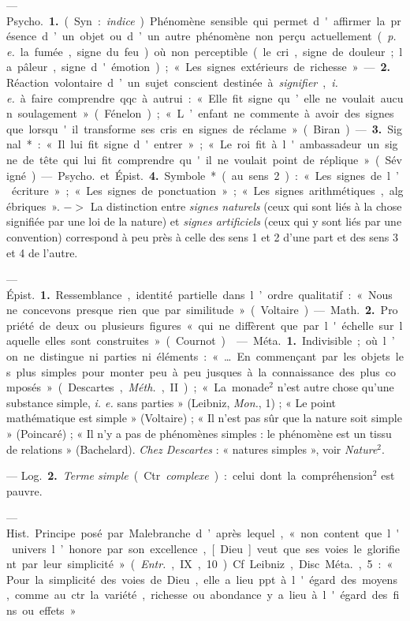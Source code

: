\begin{itemize}[leftmargin=1cm, label=, itemsep=1pt]
 — \si{Psycho.} {\bf 1.} (Syn. : {\it indice}). Phénomène sensible
qui permet d'affirmer la présence d’un objet ou d’un autre phénomène non
perçu actuellement ({\it p. e.} la fumée, signe du feu) où non perceptible
(le cri, signe de douleur ; la pâleur, signe d'émotion) ; « Les signes
extérieurs de richesse ». — {\bf 2.} Réaction volontaire d’un sujet conscient
destinée à {\it signifier}, {\it i. e.} à faire comprendre qqc. à autrui : «
Elle fit signe qu’elle ne voulait aucun soulagement » (Fénelon) ; « L’enfant
ne commente à avoir des signes que lorsqu'il transforme ses cris en signes de
réclame » (Biran). — {\bf 3.} Signal* : « Il lui fit signe d'entrer » ; « Le
roi fit à l'ambassadeur un signe de tête qui lui fit comprendre qu'il ne
voulait point de réplique » (Sévigné). — \si{Psycho.} et \si{Épist.} {\bf 4.}
Symbole* (au sens 2) : « Les signes de l’écriture »; « Les signes de
ponctuation »; « Les signes arithmétiques, algébriques ». $->$ La distinction
entre {\it signes naturels} (ceux qui sont liés à la chose signifiée par une
loi de la nature) et {\it signes artificiels} (ceux qui y sont liés par une
convention) correspond à peu près à celle des sens 1 et 2 d’une part et des
sens 3 et 4 de l'autre.

 — \si{Épist.} {\bf 1.} Ressemblance, identité partielle dans
l’ordre qualitatif : « Nous ne concevons presque rien que par
similitude » (Voltaire). — \si{Math.} {\bf 2.} Propriété de deux ou plusieurs
figures « qui ne diffèrent
que par l'échelle sur laquelle elles sont construites » (Cournot).

 — \si{Méta.} {\bf 1.} Indivisible ; où l’on ne distingue ni
parties ni éléments : « … En commençant par les objets les plus simples...
pour monter peu à peu jusques à la connaissance des plus
composés » (Descartes, {\it Méth.}, II) ; « La monade$^2$ n’est autre chose
qu’une substance simple, {\it i. e.} sans parties » (Leibniz, {\it Mon.},
1) ; « Le point mathématique est simple » (Voltaire) ; « Il n’est pas sûr que
la nature soit simple » (Poincaré) ; « Il n'y a pas de phénomènes simples :
le phénomène est un tissu de relations » (Bachelard). {\it Chez Descartes} :
« natures simples », voir {\it Nature}$^2$.

— \si{Log.} {\bf 2.} {\it Terme simple} (Ctr.
{\it complexe}) : celui dont la compréhension$^2$ est pauvre.

 — \si{Hist.} Principe posé par Malebranche d’après
lequel, « non content que l'univers l’honore par son excellence, [Dieu] veut
que ses voies le glorifient par leur simplicité » ({\it Entr.}, IX, 10). Cf.
Leibniz, Disc. \si{Méta.}, 5 : « Pour la simplicité des voies de Dieu, elle a
lieu ppt. à l'égard des moyens, comme au ctr. la variété, richesse ou
abondance y a lieu à l'égard des fins ou effets. »


\end{itemize}

